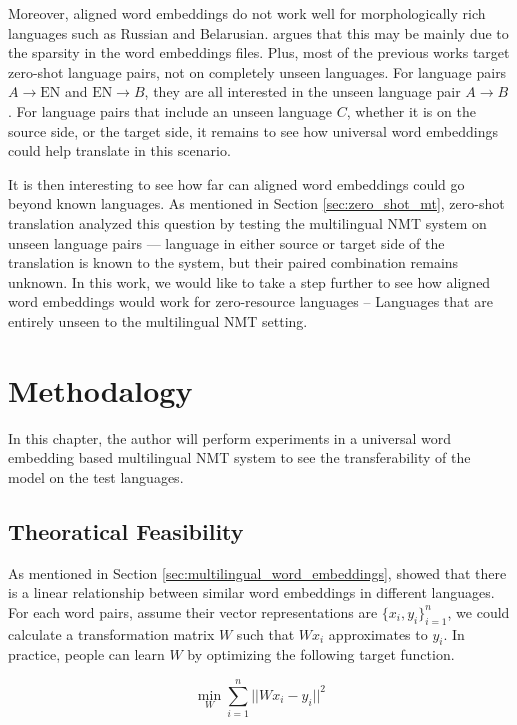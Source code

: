 \documentclass[thesis,fonts=libertine]{cluu}
\begin{document}
Moreover, aligned word embeddings do not work well for morphologically rich languages such as Russian and Belarusian. \cite{Qi:2018aa} argues that this may be mainly due to the sparsity in the word embeddings files. Plus, most of the previous works target zero-shot language pairs, not on completely unseen languages. For language pairs $A \rightarrow \text{EN}$ and $\text{EN} \rightarrow B$, they are all interested in the unseen language pair $A \rightarrow B$. For language pairs that include an unseen language $C$, whether it is on the source side, or the target side, it remains to see how universal word embeddings could help translate in this scenario.

It is then interesting to see how far can aligned word embeddings could go beyond known languages. As mentioned in Section \ref{sec:zero_shot_mt}, zero-shot translation analyzed this question by testing the multilingual NMT system on unseen language pairs --- language in either source or target side of the translation is known to the system, but their paired combination remains unknown. In this work, we would like to take a step further to see how aligned word embeddings would work for zero-resource languages -- Languages that are entirely unseen to the multilingual NMT setting.

\chapter{Methodalogy}
\label{chap:method}

In this chapter, the author will perform experiments in a universal word embedding based multilingual NMT system to see the transferability of the model on the test languages.

\section{Theoratical Feasibility}

As mentioned in Section \ref{sec:multilingual_word_embeddings}, \cite{Mikolov:2013ac} showed that there is a linear relationship between similar word embeddings in different languages. For each word pairs, assume their vector representations are $\{x_i, y_i\}_{i=1}^n$, we could calculate a transformation matrix $W$ such that $Wx_i$ approximates to $y_i$. In practice, people can learn $W$ by optimizing the following target function.

\begin{equation*}
  \min_W\sum_{i=1}^n||Wx_i-y_i||^2
\end{equation*}
\end{document}
